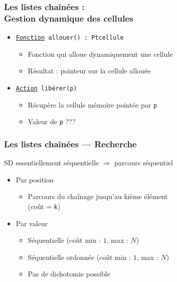 \documentclass[table,handout,tikz,12pt,svgnames]{beamer}
\begin{document}
\begin{frame}[fragile=singleslide]
	\frametitle{Les listes chaînées :\\ Gestion dynamique des cellules}
	\begin{block}{} %
		\begin{itemize}
			\item \texttt{\underline{Fonction} allouer() : Ptcellule}
			\begin{itemize}
				\item Fonction qui alloue dynamiquement une cellule 
				\item Résultat : pointeur sur la cellule allouée
			\end{itemize}
			\item \texttt{\underline{Action} libérer(p)}
			\begin{itemize}
				\item Récupère la cellule mémoire pointée par \texttt{p}
				\item Valeur de \texttt{p} ???
			\end{itemize}
		\end{itemize}
	\end{block}
\end{frame}


\begin{frame}[fragile=singleslide]
	\frametitle{Les listes chaînées --- Recherche}
	\begin{block}{SD essentiellement séquentielle $\Rightarrow$ parcours séquentiel} %
		\begin{itemize}
			\item Par position
			\begin{itemize}
				\item Parcours du chaînage jusqu'au kième élément \\
                (coût = \texttt{k})
			\end{itemize}
			\item Par valeur
			\begin{itemize}
				\item Séquentielle (coût min : $1$, max : $N$)
				\item Séquentielle ordonnée (coût min : $1$, max : $N$)
				\item Pas de dichotomie possible
			\end{itemize}
		\end{itemize}
	\end{block}
\end{frame}
\end{document}
